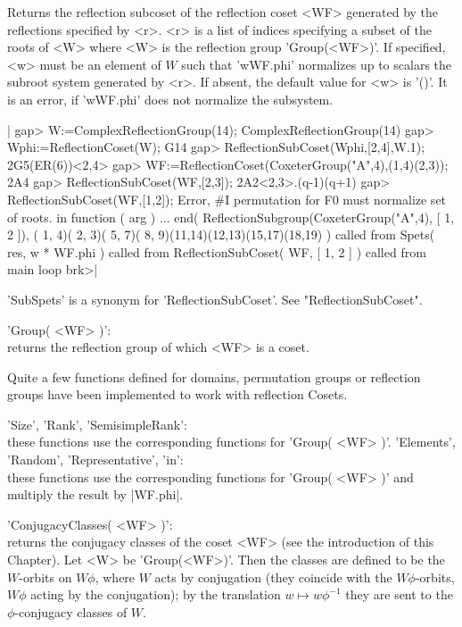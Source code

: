 Returns  the reflection subcoset of the  reflection coset <WF> generated by
the  reflections specified by  <r>. <r> is  a list of  indices specifying a
subset of the roots of <W> where <W> is the reflection group 'Group(<WF>)'.
If  specified,  <w>  must  be  an  element  of  $W$  such  that 'w\*WF.phi'
normalizes  up to scalars  the subroot system  generated by <r>. If absent,
the  default value for <w> is '()'. It is an error, if 'w\*WF.phi' does not
normalize the subsystem.

|    gap> W:=ComplexReflectionGroup(14);
    ComplexReflectionGroup(14)
    gap> Wphi:=ReflectionCoset(W);
    G14
    gap> ReflectionSubCoset(Wphi,[2,4],W.1);
    2G5(ER(6))<2,4>
    gap> WF:=ReflectionCoset(CoxeterGroup("A",4),(1,4)(2,3));
    2A4
    gap> ReflectionSubCoset(WF,[2,3]);
    2A2<2,3>.(q-1)(q+1)
    gap> ReflectionSubCoset(WF,[1,2]);
    Error, #I permutation for F0 must normalize set of roots.
     in
    function ( arg ) ... end(
     ReflectionSubgroup(CoxeterGroup("A",4), [ 1, 2 ]),
     ( 1, 4)( 2, 3)( 5, 7)( 8, 9)(11,14)(12,13)(15,17)(18,19)
     ) called from
    Spets( res, w * WF.phi ) called from
    ReflectionSubCoset( WF, [ 1, 2 ] ) called from
    main loop
    brk>|


'SubSpets' is a synonym for 'ReflectionSubCoset'. See "ReflectionSubCoset".


'Group( <WF> )':\\
     returns the reflection group of which <WF> is a coset.

Quite a few functions defined for domains, permutation groups or reflection
groups have been implemented to work with reflection Cosets.

'Size', 'Rank', 'SemisimpleRank':\\ these functions use the corresponding
     functions for 'Group( <WF> )'.
'Elements', 'Random', 'Representative',  'in':\\  these functions
     use the corresponding functions for 'Group( <WF> )' and multiply the
     result by |WF.phi|.

'ConjugacyClasses(  <WF>  )':\\ returns  the   conjugacy classes  of  the
  coset   <WF>  (see  the  introduction  of   this  Chapter).  Let  <W>  be
  'Group(<WF>)'.  Then the classes  are defined to  be the $W$-orbits on $W
  \phi$,  where  $W$  acts  by  conjugation  (they  coincide  with  the  $W
  \phi$-orbits,  $W \phi$ acting by the conjugation); by the translation $w
  \mapsto w\phi^{-1}$ they are sent to the $\phi$-conjugacy classes of $W$.

